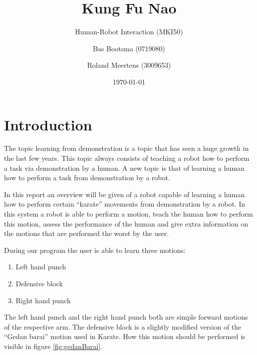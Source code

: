 \documentclass[10pt,a4paper,oneside]{scrartcl}
\begin{document}
\title{Kung Fu Nao}
\subtitle{Human-Robot Interaction (MKI50)}

\author{ Bas Bootsma (0719080) \and Roland Meertens (3009653)}

\date{\today}

\maketitle

\section{Introduction}

The topic learning from demonstration is a topic that has seen a huge growth in the last few years.
This topic always consists of teaching a robot how to perform a task via demonstration by a human.  
A new topic is that of learning a human how to perform a task from demonstration by a robot. 

In this report an overview will be given of a robot capable of learning a human how to perform certain ``karate'' movements from demonstration by a robot. 
In this system a robot is able to perform a motion, teach the human how to perform this motion, assess the performance of the human and give extra information on the motions that are performed the worst by the user. 

During our program the user is able to learn three motions: 
\begin{enumerate}
  \item Left hand punch
  \item Defensive block
  \item Right hand punch
\end{enumerate}
The left hand punch and the right hand punch both are simple forward motions of the respective arm. 
The defensive block is a slightly modified version of the ``Gedan barai'' motion used in Karate. 
How this motion should be performed is visible in figure \ref{fig:gedanBarai}. 
\end{document}
